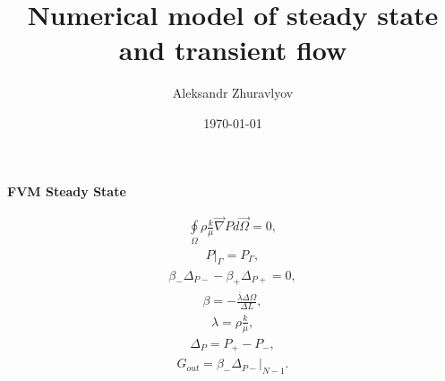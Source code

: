 \documentclass[a4paper,12pt]{extreport}
\author{Aleksandr Zhuravlyov}
\title{Numerical model of steady state and transient flow}
\date{\today}
\begin{document}
    \pagecolor{pageColor}
    \color{fontColor}

    \begin{multicols}{2}
        \begin{center}
        {\large \textbf{FVM Steady State}}
        \end{center}
        \begin{eqnarray}
            \label{eq:poisson_integral}
            \oint \limits_{\Omega} \rho \frac{k}{\mu} \vec{\nabla}P d\vec{\Omega} = 0,
        \end{eqnarray}
        \begin{eqnarray}
            \label{eq:poisson_integral_bound}
            P \Big|_\Gamma = P_\Gamma,
        \end{eqnarray}
        \begin{eqnarray}
            \label{eq:poisson_integral_num}
            \beta_{-}\Delta_{P-} - \beta_{+}\Delta_{P+} = 0,
        \end{eqnarray}
        \begin{eqnarray}
            \label{eq:beta}
            \beta = - \frac{\overline{\lambda} \Delta \Omega}{\Delta L},
        \end{eqnarray}
        \begin{eqnarray}
            \label{eq:lambda}
            \lambda = \rho \frac{k}{\mu},
        \end{eqnarray}
        \begin{eqnarray}
            \label{eq:delta_P_num}
            \Delta_{P} = P_{+} - P_{-},
        \end{eqnarray}
        \begin{eqnarray}
            \label{eq:Consumption_poisson_integral}
            G_{out} = \beta_-\Delta_{P-} \Big|_ {N-1}.
        \end{eqnarray}


\end{multicols}
\end{document}
